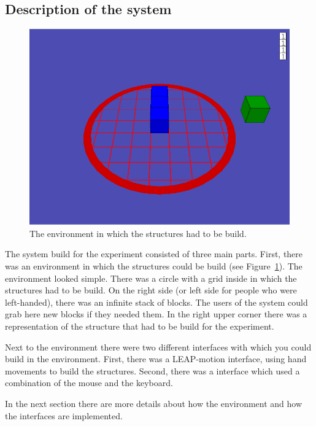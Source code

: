 \subsection{Description of the system}
\begin{figure}[H]
\includegraphics[width=\textwidth]{imgs/environment}
\caption{The environment in which the structures had to be build.}
\label{fig:environment}
\end{figure}

The system build for the experiment consisted of three main parts. First, there was an environment in which the structures could be build (see Figure~\ref{fig:environment}). The environment looked simple. There was a circle with a grid inside in which the structures had to be build. On the right side (or left side for people who were left-handed), there was an infinite stack of blocks. The users of the system could grab here new blocks if they needed them. In the right upper corner there was a representation of the structure that had to be build for the experiment.

Next to the environment there were two different interfaces with which you could build in the environment. First, there was a LEAP-motion interface, using hand movements to build the structures. Second, there was a interface which used a combination of the mouse and the keyboard.

In the next section there are more details about how the environment and how the interfaces are implemented.
